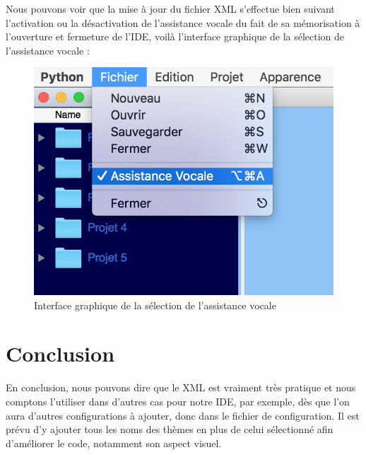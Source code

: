 \documentclass[a4paper,12pt]{article}
\begin{document}
Nous pouvons voir que la mise à jour du fichier XML s'effectue bien suivant l'activation ou la désactivation de l'assistance vocale du fait de sa mémorisation à l'ouverture et fermeture de l'IDE, voilà l'interface graphique de la sélection de l'assistance vocale : 

\begin{figure}[h!]
			\begin{center}
				\includegraphics[scale=0.5]{images/assistance_vocale.png}
				\caption{Interface graphique de la sélection de l'assistance vocale}
			\end{center}
		\end{figure}
		
\section{Conclusion}

En conclusion, nous pouvons dire que le XML est vraiment très pratique et nous comptons l'utiliser dans d'autres cas pour notre IDE, par exemple, dès que l'on aura d'autres configurations à ajouter, donc dans le fichier de configuration. Il est prévu d'y ajouter tous les noms des thèmes en plus de celui sélectionné afin d'améliorer le code, notamment son aspect visuel.
		
\end{document}

